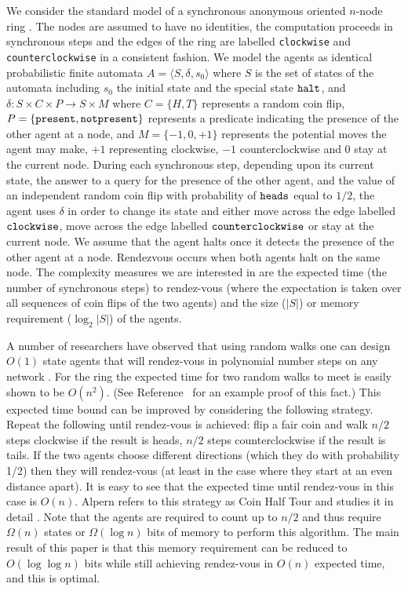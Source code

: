 \documentclass[lotsofwhite]{patmorin}
\begin{document}
We consider the standard model of a synchronous anonymous oriented
$n$-node ring \cite{santoro}. The nodes are assumed to have no
identities, the computation proceeds in synchronous steps and the
edges of the ring are labelled {\tt clockwise} and {\tt
counterclockwise} in a consistent fashion.  We model the agents as
identical probabilistic finite automata $A = \langle S, \delta, s_0
\rangle$ where
$S$ is the set of states of the automata including $s_0$ the initial
state and the special state ${\tt halt}$, and $\delta:S \times C
\times P \to S \times M$ where $C = \{ H, T \}$ represents a random
coin flip, $P = \{ \tt present, notpresent \}$ represents a predicate
indicating the presence of the other agent at a node, and $M = \{ -1,
0, +1 \}$ represents the potential moves the agent may make, $+1$
representing clockwise, $-1$ counterclockwise and $0$ stay at the
current node.  During each synchronous step, depending upon its
current state, the answer to a query for the presence of the other
agent, and the value of an independent random coin flip with
probability of $\tt heads$ equal to $1/2$, the agent uses $\delta$ in
order to change its state and either move across the edge labelled $\tt
clockwise$, move across the edge labelled $\tt counterclockwise$ or
stay at the current node. We assume that the
agent halts once it detects the presence of the other agent at a node.
Rendezvous occurs when both agents halt on the same node.  The
complexity measures  we are interested in are the expected time (the
number of synchronous steps) to rendez-vous (where the expectation is
taken over all sequences of coin flips of the two agents) and the size
($|S|$) or memory requirement ($\log_2 |S|$) of the agents.  

A number of researchers have observed that using random walks one can
design $O(1)$ state agents that will rendez-vous in polynomial number
steps on any network \cite{coppersmith}. For the ring the expected
time for two random walks to meet is easily shown to be $O(n^2)$. (See
Reference~\cite{kk} for an example proof of this fact.) This expected time bound
can be improved by considering the following strategy.  Repeat the
following until rendez-vous is achieved: flip a fair coin and walk
$n/2$ steps clockwise if the result is heads, $n/2$ steps
counterclockwise if the result is tails.  If the two agents choose
different directions (which they do with probability 1/2) then they
will rendez-vous (at least in the case where they start at an even
distance apart).  It is easy to see that the expected time until
rendez-vous in this case is $O(n)$. Alpern refers to this strategy as
Coin Half Tour and studies it in detail \cite{alpern95}.  Note that
the agents are required to count up to $n/2$ and thus require $\Omega(n)$
states or $\Omega(\log n)$ bits of memory to perform this algorithm. 
The main result of this paper is that this memory requirement can be
reduced to $O(\log\log n)$ bits while still achieving rendez-vous in
$O(n)$ expected time, and this is optimal.
\end{document}
